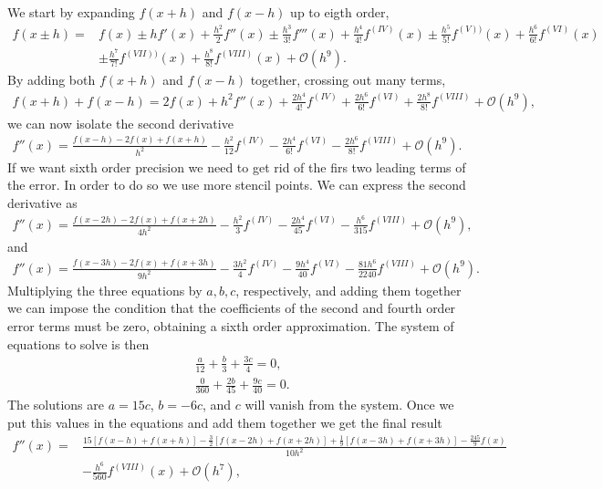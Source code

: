 \begin{solution}
We start by expanding $f(x+h)$ and $f(x-h)$ up to eigth order,
\begin{align*}
f(x\pm h)=&f(x)\pm hf'(x)+\frac{h^2}{2}f''(x)\pm\frac{h^3}{3!}f'''(x)+\frac{h^4}{4!}f^{(IV)}(x)\pm\frac{h^5}{5!}f^{(V))}(x)+\frac{h^6}{6!}f^{(VI)}(x)\\
&\pm\frac{h^7}{7!}f^{(VII))}(x)+\frac{h^8}{8!}f^{(VIII)}(x)+\mathcal{O}(h^9).
\end{align*}
By adding both $f(x+h)$ and $f(x-h)$ together, crossing out many terms, 
\begin{align*}
f(x+h)+f(x-h)=2f(x)+h^2f''(x)+\frac{2h^4}{4!}f^{(IV)}+\frac{2h^6}{6!}f^{(VI)}+\frac{2h^8}{8!}f^{(VIII)}+\mathcal{O}(h^9),
\end{align*}
we can now isolate the second derivative
\begin{align*}
f''(x)=\frac{f(x-h)-2f(x)+f(x+h)}{h^2}-\frac{h^2}{12}f^{(IV)}-\frac{2h^4}{6!}f^{(VI)}-\frac{2h^6}{8!}f^{(VIII)}+\mathcal{O}(h^9).
\end{align*}
If we want sixth order precision we need to get rid of the firs two leading terms of the error. In order to do so we use more stencil points. We can express the second derivative as
\begin{align*}
f''(x)=\frac{f(x-2h)-2f(x)+f(x+2h)}{4h^2}-\frac{h^2}{3}f^{(IV)}-\frac{2h^4}{45}f^{(VI)}-\frac{h^6}{315}f^{(VIII)}+\mathcal{O}(h^9),
\end{align*}
and
\begin{align*}
f''(x)=\frac{f(x-3h)-2f(x)+f(x+3h)}{9h^2}-\frac{3h^2}{4}f^{(IV)}-\frac{9h^4}{40}f^{(VI)}-\frac{81h^6}{2240}f^{(VIII)}+\mathcal{O}(h^9).
\end{align*}
Multiplying the three equations by $a,b,c$, respectively, and adding them together we can impose the condition that the coefficients of the second and fourth order error terms must be zero, obtaining a sixth order approximation. The system of equations to solve is then
\begin{align*}
&\frac{a}{12}+\frac{b}{3}+\frac{3c}{4}=0,\\
&\frac{0}{360}+\frac{2b}{45}+\frac{9c}{40}=0.
\end{align*}
The solutions are $a=15c$, $b=-6c$, and $c$ will vanish from the system. Once we put this values in the equations and add them together we get the final result
\begin{align*}
f''(x)=&\frac{15\left[f(x-h)+f(x+h)\right]-\frac{3}{2}\left[f(x-2h)+f(x+2h)\right]+\frac{1}{9}\left[f(x-3h)+f(x+3h)\right]-\frac{245}{9}f(x)}{10h^2}\\&-\frac{h^6}{560}f^{(VIII)}(x)+\mathcal{O}(h^7),

\end{align*}
\end{solution}
